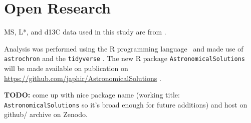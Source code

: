 \documentclass[draft]{agujournal2019}
\begin{document}
%
%

%

%



\section*{Open Research}

\Gls{MS}, \gls{L*}, and \gls{d13C} data used in this study are from .

Analysis was performed using the R programming language~\cite{RCoreTeam2020} and made use of \texttt{astrochron}  and the \texttt{tidyverse} .
The new R package \texttt{AstronomicalSolutions} will be made available on publication on \url{https://github.com/japhir/AstronomicalSolutions} .

\textbf{TODO:} come up with nice package name (working title: \texttt{AstronomicalSolutions} so it's broad enough for future additions) and host on github/ archive on Zenodo.


\end{document}

